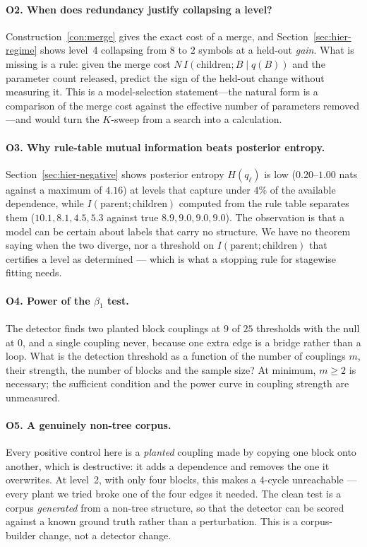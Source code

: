 \documentclass[11pt,a4paper]{article}
\theoremstyle{plain}
\theoremstyle{definition}
\begin{document}
\paragraph{O2. When does redundancy justify collapsing a level?}
Construction~\ref{con:merge} gives the exact cost of a merge, and
Section~\ref{sec:hier-regime} shows level~4 collapsing from $8$ to $2$ symbols
at a held-out \emph{gain}. What is missing is a rule: given the merge cost
$N\,I(\text{children};B\mid q(B))$ and the parameter count released, predict the
sign of the held-out change without measuring it. This is a model-selection
statement---the natural form is a comparison of the merge cost against the
effective number of parameters removed---and would turn the $K$-sweep from a
search into a calculation.

\paragraph{O3. Why rule-table mutual information beats posterior entropy.}
Section~\ref{sec:hier-negative} shows posterior entropy $H(q_\ell)$ is low
($0.20$--$1.00$ nats against a maximum of $4.16$) at levels that capture under
$4\%$ of the available dependence, while $I(\text{parent};\text{children})$
computed from the rule table separates them ($10.1, 8.1, 4.5, 5.3$ against true
$8.9, 9.0, 9.0, 9.0$). The observation is that a model can be certain about
labels that carry no structure. We have no theorem saying when the two
diverge, nor a threshold on $I(\text{parent};\text{children})$ that certifies a
level as determined --- which is what a stopping rule for stagewise fitting
needs.

\paragraph{O4. Power of the $\beta_1$ test.}
The detector finds two planted block couplings at $9$ of $25$ thresholds with
the null at $0$, and a single coupling never, because one extra edge is a
bridge rather than a loop. What is the detection threshold as a function of the
number of couplings $m$, their strength, the number of blocks and the sample
size? At minimum, $m \ge 2$ is necessary; the sufficient condition and the
power curve in coupling strength are unmeasured.

\paragraph{O5. A genuinely non-tree corpus.}
Every positive control here is a \emph{planted} coupling made by copying one
block onto another, which is destructive: it adds a dependence and removes the
one it overwrites. At level~2, with only four blocks, this makes a $4$-cycle
unreachable --- every plant we tried broke one of the four edges it needed. The
clean test is a corpus \emph{generated} from a non-tree structure, so that the
detector can be scored against a known ground truth rather than a perturbation.
This is a corpus-builder change, not a detector change.
\end{document}

